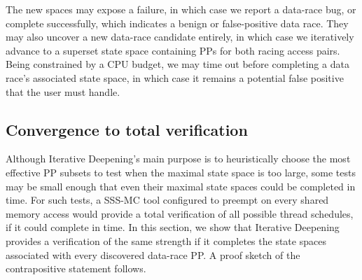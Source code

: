 The new spaces may expose a failure, in which case we report a data-race bug,
or complete successfully, which indicates a benign or false-positive data race.
They may also uncover a new data-race candidate entirely, %
in which case we iteratively advance to a superset state space containing PPs for both racing access pairs.
Being constrained by a CPU budget,
we may time out before completing a data race's associated state space,
in which case it remains a potential false positive that the user must handle.

\subsection{Convergence to total verification}
\label{sec:totalverif}

Although Iterative Deepening's main purpose is to heuristically choose the most effective PP subsets to test
when the maximal state space is too large,
some tests may be small enough that even their maximal state spaces could be completed in time.
For such tests, a SSS-MC tool configured to preempt on every shared memory access \cite{spin} would provide a total verification of all possible thread schedules, if it could complete in time.
In this section, we show that Iterative Deepening provides a verification of the same strength if it completes the state spaces associated with every discovered data-race PP.
A proof sketch of the contrapositive statement follows.

